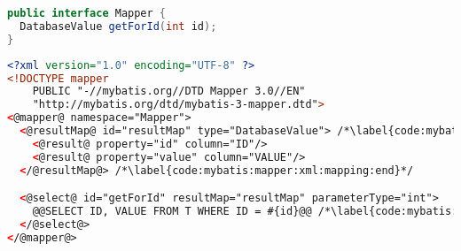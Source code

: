 
\begin{lstlisting}[language=Java, belowskip=-2mm]
public interface Mapper {
  DatabaseValue getForId(int id);
}
\end{lstlisting}

\begin{lstlisting}[language=XML, caption={Definition of XML Mapper interface}, label={code:mybatis:interface:xml}]
<?xml version="1.0" encoding="UTF-8" ?>
<!DOCTYPE mapper
    PUBLIC "-//mybatis.org//DTD Mapper 3.0//EN"
    "http://mybatis.org/dtd/mybatis-3-mapper.dtd">
<@mapper@ namespace="Mapper">
  <@resultMap@ id="resultMap" type="DatabaseValue"> /*\label{code:mybatis:mapper:xml:mapping:begin}*/
    <@result@ property="id" column="ID"/>
    <@result@ property="value" column="VALUE"/>
  </@resultMap@> /*\label{code:mybatis:mapper:xml:mapping:end}*/

  <@select@ id="getForId" resultMap="resultMap" parameterType="int">
    @@SELECT ID, VALUE FROM T WHERE ID = #{id}@@ /*\label{code:mybatis:mapper:xml:query}*/
  </@select@>
</@mapper@>
\end{lstlisting}
